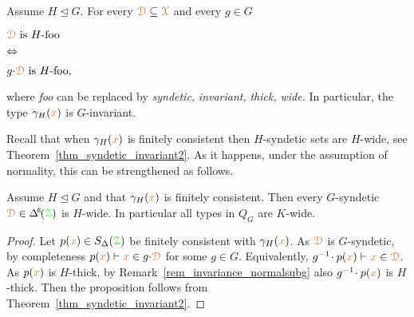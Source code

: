 \begin{remark}\label{rem_invariance_normalsubg}
\def\medrel#1{\parbox[t]{5ex}{$\displaystyle\hfil #1$}}
\def\ceq#1#2#3{\parbox[t]{20ex}{$\displaystyle #1$}\medrel{#2}{$\displaystyle #3$}}
  Assume $H\trianglelefteq G$.
  For every ${\color{brown}\EuScript D}\subseteq{\color{brown}\EuScript X}$ and every $g\in G$ \smallskip
  
  \ceq{\hfill\mrD\textrm{ is }H\textrm{-foo}}{\IFF}{g{\cdot}\mrD\textrm{ is }H\textrm{-foo},} \smallskip
  
  where \textit{foo\/} can be replaced by \textit{syndetic,} \textit{invariant,} \textit{thick,} \textit{wide.}
  In particular, the type $\gamma_H({\color{brown} x})$ is $G$-invariant.
\end{remark}

Recall that when $\gamma_H({\color{brown} x})$ is finitely consistent then $H$-syndetic sets are $H$-wide, see Theorem~\ref{thm_syndetic_invariant2}.
As it happens, under the assumption of normality, this can be strengthened as follows.

\begin{proposition}\label{prop_Gsyndetic_Hthick1}
  Assume $H\trianglelefteq G$ and that $\gamma_H({\color{brown} x})$ is finitely consistent.
  Then every $G$-syndetic $\mrD\in\BDelta(\grZ)$ is $H$-wide.
  In particular all types in $Q_G$ are $K$-wide.
\end{proposition}

\begin{proof}
  Let $p({\color{brown} x})\in S_\Delta({\color{green}\EuScript Z})$ be finitely consistent with $\gamma_H({\color{brown} x})$.
  As ${\color{brown}\EuScript D}$ is $G$-syndetic, by completeness $p({\color{brown} x})\vdash{\color{brown}x}\in g{\cdot}{\color{brown}\EuScript D}$ for some $g\in G$.
  Equivalently, $g^{-1}\!\cdot p({\color{brown} x})\vdash{\color{brown}x}\in{\color{brown}\EuScript D}$.
  As $p({\color{brown} x})$ is $H$-thick, by Remark~\ref{rem_invariance_normalsubg} also $g^{-1}\!\cdot p({\color{brown} x})$ is $H$-thick.
  Then the proposition follows from Theorem~\ref{thm_syndetic_invariant2}.
\end{proof}

